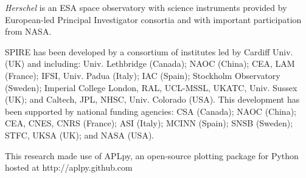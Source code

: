 \documentclass[a4,useAMS,usenatbib]{mn2e}
\begin{document}
{\em Herschel} is an ESA space observatory with science instruments
provided by European-led Principal Investigator consortia and with important
participation from NASA.

SPIRE has been developed by a consortium of institutes led by Cardiff
Univ. (UK) and including: Univ. Lethbridge (Canada); NAOC (China);
CEA, LAM (France); IFSI, Univ. Padua (Italy); IAC (Spain); Stockholm
Observatory (Sweden); Imperial College London, RAL, UCL-MSSL, UKATC,
Univ. Sussex (UK); and Caltech, JPL, NHSC, Univ. Colorado (USA). This
development has been supported by national funding agencies: CSA
(Canada); NAOC (China); CEA, CNES, CNRS (France); ASI (Italy); MCINN
(Spain); SNSB (Sweden); STFC, UKSA (UK); and NASA (USA).

This research made use of APLpy, an open-source plotting package for
Python hosted at http://aplpy.github.com



\end{document}
